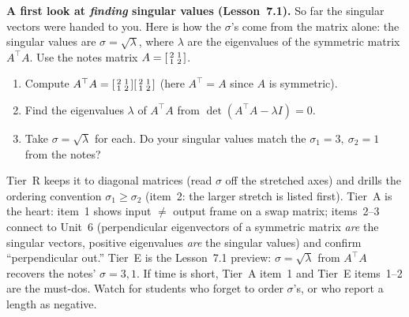 \documentclass[10pt]{article}
\newcommand{\T}{^{\top}}
\begin{document}
\begin{tcolorbox}[colback=white, colframe=black!40, title=\textbf{Tier E --- Extension},
    fonttitle=\bfseries, arc=1.5mm, left=3mm, right=3mm, top=2mm, bottom=2mm, breakable]
\textbf{A first look at \emph{finding} singular values (Lesson~7.1).} So far the singular vectors were
handed to you. Here is how the $\sigma$'s come from the matrix alone: the singular values are
$\sigma=\sqrt{\lambda}$, where $\lambda$ are the eigenvalues of the symmetric matrix $A\T A$. Use the
notes matrix $A=\begin{bsmallmatrix} 2 & 1\\ 1 & 2 \end{bsmallmatrix}$.
\begin{enumerate}[leftmargin=1.7em, itemsep=9pt]
  \item Compute $A\T A=\begin{bsmallmatrix} 2 & 1\\ 1 & 2 \end{bsmallmatrix}\begin{bsmallmatrix} 2 & 1\\ 1 & 2 \end{bsmallmatrix}$ (here $A\T=A$ since $A$ is symmetric).
        \ansline{$A\T A=\begin{bsmallmatrix} 5 & 4\\ 4 & 5 \end{bsmallmatrix}$.}
  \item Find the eigenvalues $\lambda$ of $A\T A$ from $\det(A\T A-\lambda I)=0$.
  \item Take $\sigma=\sqrt{\lambda}$ for each. Do your singular values match the $\sigma_1=3,\ \sigma_2=1$
        from the notes?
\end{enumerate}
\end{tcolorbox}

\begin{teachernote}
Tier~R keeps it to diagonal matrices (read $\sigma$ off the stretched axes) and drills the ordering
convention $\sigma_1\ge\sigma_2$ (item~2: the larger stretch is listed first). Tier~A is the heart:
item~1 shows input $\ne$ output frame on a swap matrix; items~2--3 connect to Unit~6 (perpendicular
eigenvectors of a symmetric matrix \emph{are} the singular vectors, positive eigenvalues \emph{are} the
singular values) and confirm ``perpendicular out.'' Tier~E is the Lesson~7.1 preview: $\sigma=\sqrt{\lambda}$
from $A\T A$ recovers the notes' $\sigma=3,1$. If time is short, Tier~A item~1 and Tier~E items~1--2 are the
must-dos. Watch for students who forget to order $\sigma$'s, or who report a length as negative.
\end{teachernote}
\end{document}
